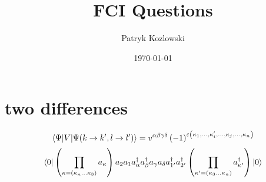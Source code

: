 \documentclass[12pt]{article}
\title{FCI Questions}
\author{Patryk Kozlowski}
\date{\today}
\begin{document}
\maketitle
\section{two differences}
\begin{equation}
    \mel{\Psi }{V}{\Psi (k\rightarrow k^{\prime}, l\rightarrow l^{\prime})}=v^{\alpha\beta\gamma\delta}\left(-1\right)^{\varepsilon\left(\kappa_{1},\dots,\kappa_{i}^{\prime},\dots,\kappa _{j},...,\kappa_{n}\right)}\\
\end{equation}
\begin{equation}
    \bra{0}\left(\prod_{\kappa=\left(\kappa_{n}\dots\kappa_{3}\right)}a_{\kappa}\right)
        a_{2}a_{1}a^{\dag}_{\alpha }a^{\dag}_{\beta }a_{\gamma }a_{\delta }a^{\dag}_{1^{\prime}}a^{\dag}_{2^{\prime}}
    \left(\prod_{\kappa^{\prime}=\left(\kappa_{3}\dots\kappa_{n}\right)}a^{\dag}_{\kappa^{\prime}}\right)\ket{0}
\end{equation}
\end{document}
